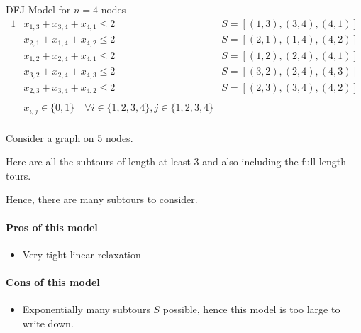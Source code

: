 \documentclass[../open-optimization/open-optimization.tex]{subfiles}
\begin{document}
\begin{example}{DFJ Model for $n=4$ nodes}{}
\begin{align*}{1}
 & x_{1,3} + x_{3,4} + x_{4,1} \leq 2& S = [(1,3),(3,4), (4,1)]\\
 & x_{2,1} + x_{1,4} + x_{4,2} \leq 2& S = [(2,1), (1,4), (4,2)]\\
 & x_{1,2} + x_{2,4} + x_{4,1} \leq 2& S = [(1,2), (2,4), (4,1)]\\
 & x_{3,2} + x_{2,4} + x_{4,3} \leq 2& S = [(3,2), (2,4), (4,3)]\\
 & x_{2,3} + x_{3,4} + x_{4,2} \leq 2& S = [(2,3), (3,4), (4,2)]\\
 \\
 & x_{i,j} \in \{0,1\} \quad\forall i \in \{1,2,3,4\}, j \in \{1,2,3,4\}\\
\end{align*}




\end{example}


\begin{example}{}{}

Consider a graph on 5 nodes.


Here are all the subtours of length at least 3 and also including the full length tours.


Hence, there are many subtours to consider.
\end{example}


\paragraph{Pros of this model}
\begin{itemize}
\item Very tight linear relaxation
\end{itemize}
\paragraph{Cons of this model}
\begin{itemize}
\item Exponentially many subtours $S$ possible, hence this model is too large to write down.
\end{itemize}
\end{document}
